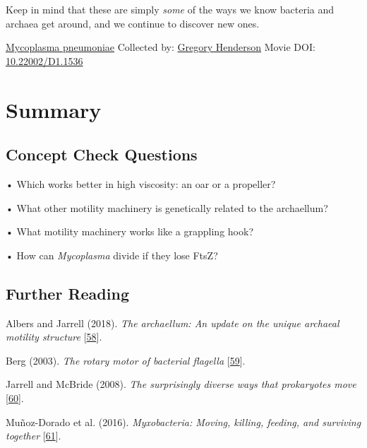\documentclass[]{tufte-book}
\begin{document}
Keep in mind that these are simply \emph{some} of the ways we know bacteria and archaea get around, and we continue to discover new ones.



\hypertarget{htmlwidget-11e8f95089a98d9e11cc}{}

\label{fig:6-12}\protect\hyperlink{tree}{Mycoplasma pneumoniae} Collected by: \protect\hyperlink{gregory_henderson}{Gregory Henderson} Movie DOI: \href{https://doi.org/10.22002/D1.1536}{10.22002/D1.1536}

\hypertarget{summary-5}{%
\section{Summary}\label{summary-5}}

\hypertarget{concept-check-questions-5}{%
\subsection*{Concept Check Questions}\label{concept-check-questions-5}}

• Which works better in high viscosity: an oar or a propeller?

• What other motility machinery is genetically related to the archaellum?

• What motility machinery works like a grappling hook?

• How can \emph{Mycoplasma} divide if they lose FtsZ?

\hypertarget{further-reading-5}{%
\subsection*{Further Reading}\label{further-reading-5}}

Albers and Jarrell (2018). \emph{The archaellum: An update on the unique archaeal motility structure} {[}\protect\hyperlink{ref-albers2018}{58}{]}.

Berg (2003). \emph{The rotary motor of bacterial flagella} {[}\protect\hyperlink{ref-berg2003}{59}{]}.

Jarrell and McBride (2008). \emph{The surprisingly diverse ways that prokaryotes move} {[}\protect\hyperlink{ref-jarrell2008}{60}{]}.

Muñoz-Dorado et al. (2016). \emph{Myxobacteria: Moving, killing, feeding, and surviving together} {[}\protect\hyperlink{ref-munoz-dorado2016}{61}{]}.
\end{document}
